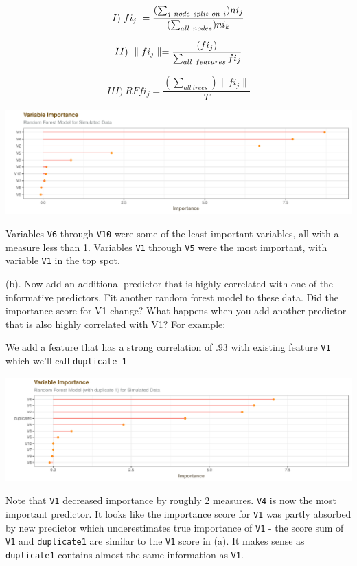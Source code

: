 \documentclass[]{report}
\begin{document}
\[
I) \  fi_j \ =\frac{ (\sum_{j \ node \ split \ on \ i}) ni_j }{ ( \sum_{all \ nodes}) ni_k}\\
\]

\[
II) \  \parallel  fi_j  \parallel = \frac{(fi_j)}{\sum_{all \ features}fi_j} \\
\]

\[
III) \ RFfi_j= \frac{ ( \sum_{all \ trees})\parallel  fi_j \parallel}{T}
\]

\includegraphics{AppliedPredictiveModeling_treebased_regression_files/figure-latex/kj-8.1a-1.pdf}

Variables \texttt{V6} through \texttt{V10} were some of the least
important variables, all with a measure less than 1. Variables
\texttt{V1} through \texttt{V5} were the most important, with variable
\texttt{V1} in the top spot.

\begin{subquestion}{(b).} Now add an additional predictor that is highly correlated with one of the informative predictors. Fit another random forest model to these data. Did the importance score for V1 change? What happens when you add another predictor that is also highly correlated with V1? For example:\end{subquestion}

We add a feature that has a strong correlation of .93 with existing
feature \texttt{V1} which we'll call \texttt{duplicate\ 1}

\includegraphics{AppliedPredictiveModeling_treebased_regression_files/figure-latex/kj-8.1b-1.pdf}

Note that \texttt{V1} decreased importance by roughly 2 measures.
\texttt{V4} is now the most important predictor. It looks like the
importance score for \texttt{V1} was partly absorbed by new predictor
which underestimates true importance of \texttt{V1} - the score sum of
\texttt{V1} and \texttt{duplicate1} are similar to the \texttt{V1} score
in (a). It makes sense as \texttt{duplicate1} contains almost the same
information as \texttt{V1}.
\end{document}
